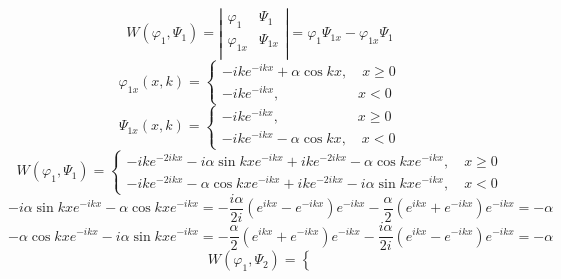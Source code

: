 \documentclass[12pt]{article}
\theoremstyle{definition}
\begin{document}
\begin{itemize}
\begin{enumerate}
        \begin{equation}
            W(\varphi_1,\Psi_1)=\left|
            \begin{array}{cc}
            \varphi_1 & \Psi_1\\
            \varphi_{1x} & \Psi_{1x} \\
        \end{array}
        \right|=\varphi_1\Psi_{1x}-\varphi_{1x}\Psi_1
        \end{equation}
        \begin{equation}
            \varphi_{1x}(x,k)=\left\{
        \begin{array}{l}
        -ike^{-ikx}+\alpha\cos kx,\quad x\geq 0\\
        -ike^{-ikx},\quad\quad\quad\quad\quad\;\; x<0
        \end{array}
        \right.
        \end{equation}
        \begin{equation}
            \Psi_{1x}(x,k)=\left\{
        \begin{array}{l}
        -ike^{-ikx},\quad\quad\quad\quad\quad\;\; x\geq 0\\
        -ike^{-ikx}-\alpha\cos kx,\quad x<0
        \end{array}
        \right.
        \end{equation}
        \begin{equation}
            W(\varphi_1,\Psi_1)=\left\{
        \begin{array}{l}
        -ike^{-2ikx}-i\alpha\sin kxe^{-ikx}+ike^{-2ikx}-\alpha\cos kxe^{-ikx},\quad x\geq 0\\
        -ike^{-2ikx}-\alpha\cos kxe^{-ikx}+ike^{-2ikx}-i\alpha\sin kxe^{-ikx},\quad x<0
        \end{array}
        \right.
        \end{equation}
        \begin{equation*}
            -i\alpha\sin kxe^{-ikx}-\alpha\cos kxe^{-ikx}=-\frac{i\alpha}{2i}(e^{ikx}-e^{-ikx})e^{-ikx}-\frac{\alpha}{2}(e^{ikx}+e^{-ikx})e^{-ikx}=-\alpha
        \end{equation*}
        \begin{equation*}
            -\alpha\cos kxe^{-ikx}-i\alpha\sin kxe^{-ikx}=-\frac{\alpha}{2}(e^{ikx}+e^{-ikx})e^{-ikx}-\frac{i\alpha}{2i}(e^{ikx}-e^{-ikx})e^{-ikx}=-\alpha
        \end{equation*}
        \begin{equation}
            W(\varphi_1,\Psi_2)=\left\{

\end{equation}
\end{enumerate}
\end{itemize}
\end{document}
